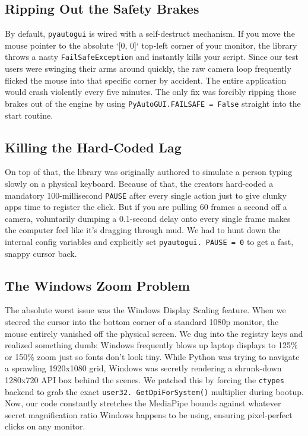 \documentclass[conference]{IEEEtran}
\begin{document}
\subsection{Ripping Out the Safety Brakes}
By default, \texttt{pyautogui} is wired with a self-destruct mechanism. If you move the mouse pointer to the absolute `[0, 0]` top-left corner of your monitor, the library throws a nasty \texttt{FailSafeException} and instantly kills your script. Since our test users were swinging their arms around quickly, the raw camera loop frequently flicked the mouse into that specific corner by accident. The entire application would crash violently every five minutes. The only fix was forcibly ripping those brakes out of the engine by using \texttt{PyAutoGUI.FAILSAFE = False} straight into the start routine.

\subsection{Killing the Hard-Coded Lag}
On top of that, the library was originally authored to simulate a person typing slowly on a physical keyboard. Because of that, the creators hard-coded a mandatory 100-millisecond \texttt{PAUSE} after every single action just to give clunky apps time to register the click. But if you are pulling 60 frames a second off a camera, voluntarily dumping a 0.1-second delay onto every single frame makes the computer feel like it's dragging through mud. We had to hunt down the internal config variables and explicitly set \texttt{pyautogui. PAUSE = 0} to get a fast, snappy cursor back.

\subsection{The Windows Zoom Problem}
The absolute worst issue was the Windows Display Scaling feature. When we steered the cursor into the bottom corner of a standard 1080p monitor, the mouse entirely vanished off the physical screen. We dug into the registry keys and realized something dumb: Windows frequently blows up laptop displays to 125\% or 150\% zoom just so fonts don't look tiny. While Python was trying to navigate a sprawling 1920x1080 grid, Windows was secretly rendering a shrunk-down 1280x720 API box behind the scenes. We patched this by forcing the \texttt{ctypes} backend to grab the exact \texttt{user32. GetDpiForSystem()} multiplier during bootup. Now, our code constantly stretches the MediaPipe bounds against whatever secret magnification ratio Windows happens to be using, ensuring pixel-perfect clicks on any monitor.
\end{document}
